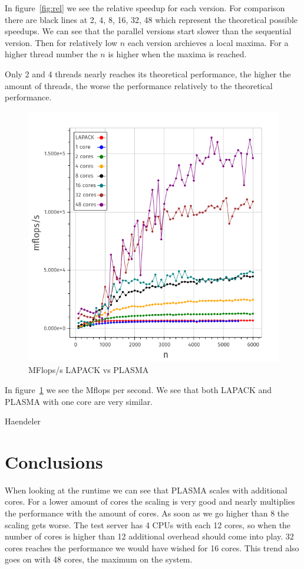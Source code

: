\documentclass[a4paper,final,ngerman,english]{article}
\begin{document}
In figure~\ref{fig:rel}
we see the relative speedup for each version.
For comparison there are black lines at 2, 4, 8, 16, 32, 48 which represent the theoretical possible speedups.
We can see that the parallel versions start slower than the sequential version.
Then for relatively low $n$ each version archieves a local maxima.
For a higher thread number the $n$ is higher when the maxima is reached. 

Only 2 and 4 threads nearly reaches its theoretical performance, the higher the amount of threads,
the worse the performance relatively to the theoretical performance.

\begin{figure}[h!]
	\centering
	\includegraphics[width=\textwidth]{mflops}
	\caption{MFlops/s LAPACK vs PLASMA} 
\label{fig:mflops}
\end{figure}

In figure~\ref{fig:mflops} we see the Mflops per second.
We see that both LAPACK and PLASMA with one core are very similar.
\begin{flushright} Haendeler \end{flushright} 

\section{Conclusions}
When looking at the runtime we can see that PLASMA scales with additional cores. 
For a lower amount of cores the scaling is very good and nearly multiplies the performance with the amount of cores.
As soon as we go higher than 8 the scaling gets worse.
The test server has 4 CPUs with each 12 cores, so when the number of cores is higher than 12 additional
overhead should come into play.
32 cores reaches the performance we would have wished for 16 cores.
This trend also goes on with 48 cores, the maximum on the system. 
\end{document}
